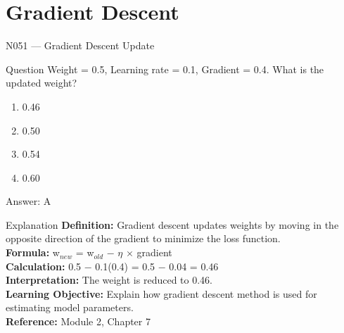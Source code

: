 \documentclass[aspectratio=169,8pt]{beamer}
\begin{document}
	\section{Gradient Descent}
	
	\begin{frame}{N051 --- Gradient Descent Update}
		\begin{block}{Question}
			Weight = 0.5, Learning rate = 0.1, Gradient = 0.4. What is the updated weight?
			\begin{enumerate}
				\item 0.46
				\item 0.50
				\item 0.54
				\item 0.60
			\end{enumerate}
		\end{block}
		\begin{exampleblock}{Answer: A}\end{exampleblock}
		\begin{block}{Explanation}
			\textbf{Definition:} Gradient descent updates weights by moving in the opposite direction of the gradient to minimize the loss function.\\
			\textbf{Formula:} w$_{new}$ = w$_{old}$ $-$ $\eta$ $\times$ gradient\\
			\textbf{Calculation:} 0.5 $-$ 0.1(0.4) = 0.5 $-$ 0.04 = 0.46\\
			\textbf{Interpretation:} The weight is reduced to 0.46.\\
			\textbf{Learning Objective:} Explain how gradient descent method is used for estimating model parameters.\\
			\textbf{Reference:} Module 2, Chapter 7
		\end{block}
	\end{frame}
	
\end{document}
